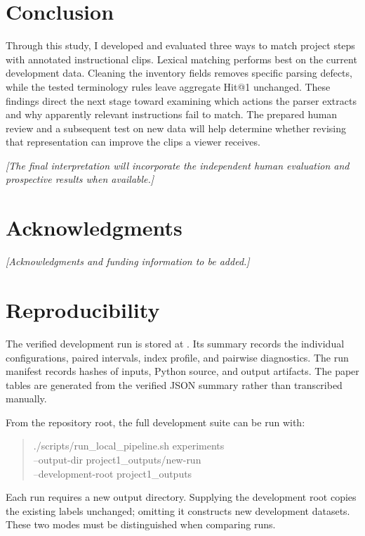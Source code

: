 \documentclass[11pt,letterpaper]{article}
\newcommand{\pending}[1]{\par\noindent\textit{[#1]}\par\vspace{0.6em}}
\begin{document}
\section{Conclusion}
Through this study, I developed and evaluated three ways to match project
steps with annotated instructional clips. Lexical matching performs best on
the current development data. Cleaning the inventory fields removes specific
parsing defects, while the tested terminology rules leave aggregate Hit@1
unchanged. These findings direct the next stage toward examining which actions
the parser extracts and why apparently relevant instructions fail to match.
The prepared human review and a subsequent test on new data will help determine
whether revising that representation can improve the clips a viewer receives.

\pending{The final interpretation will incorporate the independent human
evaluation and prospective results when available.}

\section*{Acknowledgments}
\pending{Acknowledgments and funding information to be added.}




\appendix
\section{Reproducibility}
The verified development run is stored at
. Its summary records the
individual configurations, paired intervals, index profile, and pairwise
diagnostics. The run manifest records hashes of inputs, Python source, and
output artifacts. The paper tables are generated from the verified JSON
summary rather than transcribed manually.

From the repository root, the full development suite can be run with:
\begin{quote}\small\ttfamily
./scripts/run\_local\_pipeline.sh experiments \\
\hspace*{1em}--output-dir project1\_outputs/new-run \\
\hspace*{1em}--development-root project1\_outputs
\end{quote}
Each run requires a new output directory. Supplying the development root
copies the existing labels unchanged; omitting it constructs new development
datasets. These two modes must be distinguished when comparing runs.
\end{document}
